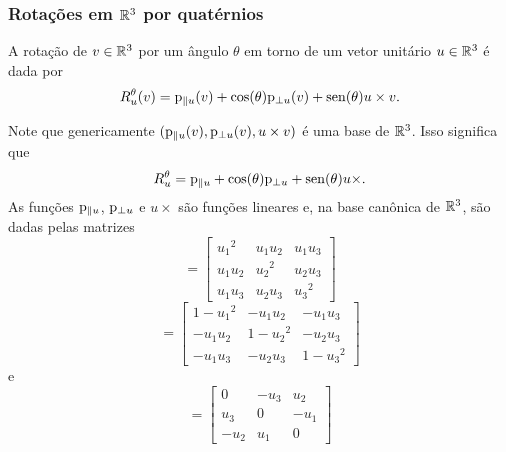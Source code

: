




\subsubsection{Rotações em \ensuremath{\R^3} por quatérnios}

A rotação de $v \in \mathbb{R}^3$ por um ângulo $\theta$ em torno de um vetor unitário $u \in \mathbb{R}^3$ é dada por
	\begin{equation*}
	R^\theta_u(v) = \mathrm{p}_{\parallel u}(v) + \cos(\theta) \mathrm{p}_{\perp u}(v) + \operatorname{sen}(\theta) u \times v.
	\end{equation*}

Note que genericamente $(\mathrm{p}_{\parallel u}(v),\mathrm{p}_{\perp u}(v),u \times v)$ é uma base de $\mathbb{R}^3$. %
Isso significa que
	\begin{equation*}
	R^\theta_u = \mathrm{p}_{\parallel u} + \cos(\theta) \mathrm{p}_{\perp u} + \operatorname{sen}(\theta){ u \times} .
	\end{equation*}
As funções $\mathrm{p}_{\parallel u}$, $\mathrm{p}_{\perp u}$ e $u \times$ são funções lineares e, na base canônica de $\mathbb{R}^3$, são dadas pelas matrizes
	\begin{equation*}
	[\proj_{\parallel u}] = 
	\begin{bmatrix}
		{u_1}^2 & u_1u_2 & u_1u_3 \\ 
		u_1u_2 & {u_2}^2 & u_2u_3 \\ 
		u_1u_3 & u_2u_3 & {u_3}^2
	\end{bmatrix}
	\end{equation*}
	\begin{equation*}
	[\proj_{\perp u}] = 
	\begin{bmatrix}
		1-{u_1}^2 & -u_1u_2 & -u_1u_3 \\ 
		-u_1u_2 & 1-{u_2}^2 & -u_2u_3 \\ 
		-u_1u_3 & -u_2u_3 & 1-{u_3}^2
	\end{bmatrix}
	\end{equation*}
e
	\begin{equation*}
	[u \times] = 
	\begin{bmatrix}
			0 & -u_3 & u_2 \\ 
			u_3 & 0 & -u_1 \\ 
			-u_2 & u_1 & 0
	\end{bmatrix}
	\end{equation*}













